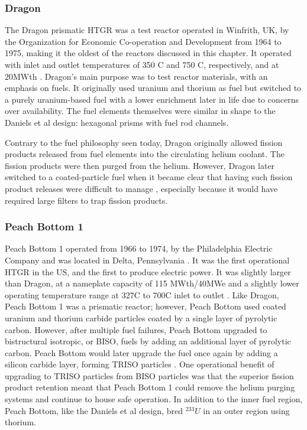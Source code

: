 \subsubsection{Dragon}
\label{dragon}

The Dragon prismatic HTGR was a test reactor operated in Winfrith, UK, by the Organization for Economic Co-operation and Development from 1964 to 1975, making it the oldest of the reactors discussed in this chapter.  It operated with inlet and outlet temperatures of 350 \textdegree C and 750 \textdegree C, respectively, and at 20MWth \cite{beck_high_2011}.  Dragon's main purpose was to test reactor materials, with an emphasis on fuels.  It originally used uranium and thorium as fuel but switched to a purely uranium-based fuel with a lower enrichment later in life due to concerns over availability.  The fuel elements themselves were similar in shape to the Daniels et al design: hexagonal prisms with fuel rod channels.

Contrary to the fuel philosophy seen today, Dragon originally allowed fission products released from fuel elements into the circulating helium coolant.  The fission products were then purged from the helium.  However, Dragon later switched to a coated-particle fuel when it became clear that having such fission product releases were difficult to manage \cite{simnad_early_1991}, especially because it would have required large filters to trap fission products.

\subsubsection{Peach Bottom 1}
\label{peach}

Peach Bottom 1 operated from 1966 to 1974, by the Philadelphia Electric Company and was located in Delta, Pennsylvania \cite{beck_high_2011}.  It was the first operational HTGR in the US, and the first to produce electric power.  It was slightly larger than Dragon, at a nameplate capacity of 115 MWth/40MWe and a slightly lower operating temperature range at 327\textdegree  C to 700\textdegree  C inlet to outlet \cite{beck_high_2011}.  Like Dragon, Peach Bottom 1 was a prismatic reactor; however, Peach Bottom used coated uranium and thorium carbide particles coated by a single layer of pyrolytic carbon.  However, after multiple fuel failures, Peach Bottom upgraded to bistructural isotropic, or BISO, fuels by adding an additional layer of pyrolytic carbon.  Peach Bottom would later upgrade the fuel once again by adding a silicon carbide layer, forming TRISO particles \cite{beck_high_2011}.  One operational benefit of upgrading to TRISO particles from BISO particles was that the superior fission product retention meant that Peach Bottom 1 could remove the helium purging systems and continue to house safe operation.  In addition to the inner fuel region, Peach Bottom, like the Daniels et al design, bred $^{233}U$ in an outer region using thorium.


